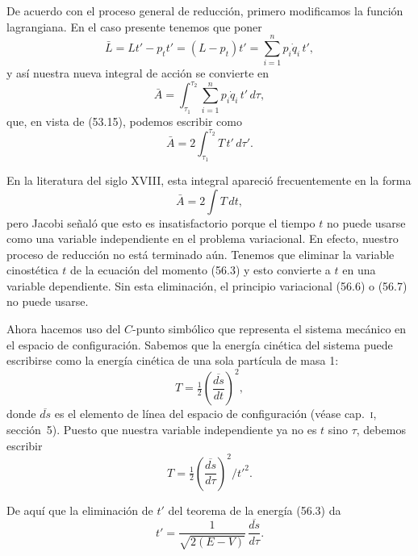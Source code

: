 \documentclass[12pt,a4paper]{book}
\begin{document}
De acuerdo con el proceso general de reducción, primero modificamos la función lagrangiana. En el caso presente tenemos que poner
\begin{equation}
\bar{L} = Lt' - p_t t' = (L - p_t)t' = \sum_{i=1}^{n} p_i \dot{q}_i \, t', \tag{56.4}
\end{equation}
y así nuestra nueva integral de acción se convierte en
\begin{equation}
\bar{A} = \int_{\tau_1}^{\tau_2} \sum_{i=1}^{n} p_i \dot{q}_i \, t' \, d\tau, \tag{56.5}
\end{equation}
que, en vista de (53.15), podemos escribir como
\begin{equation}
\bar{A} = 2\int_{\tau_1}^{\tau_2} T\,t' \, d\tau'. \tag{56.6}
\end{equation}

En la literatura del siglo XVIII, esta integral apareció frecuentemente en la forma
\begin{equation}
\bar{A} = 2\int T \, dt, \tag{56.7}
\end{equation}
pero Jacobi señaló que esto es insatisfactorio porque el tiempo $t$ no puede usarse como una variable independiente en el problema variacional. En efecto, nuestro proceso de reducción no está terminado aún. Tenemos que eliminar la variable cinostética $t$ de la ecuación del momento (56.3) y esto convierte a $t$ en una variable dependiente. Sin esta eliminación, el principio variacional (56.6) o (56.7) no puede usarse.

Ahora hacemos uso del $C$-punto simbólico que representa el sistema mecánico en el espacio de configuración. Sabemos que la energía cinética del sistema puede escribirse como la energía cinética de una sola partícula de masa 1:
\begin{equation}
T = \tfrac{1}{2}\left(\frac{\overline{ds}}{dt}\right)^2, \tag{56.8}
\end{equation}
donde $\overline{ds}$ es el elemento de línea del espacio de configuración (véase cap.~\textsc{i}, sección~5). Puesto que nuestra variable independiente ya no es $t$ sino $\tau$, debemos escribir
\begin{equation}
T = \tfrac{1}{2}\left(\frac{\overline{ds}}{d\tau}\right)^2 / t'^2. \tag{56.9}
\end{equation}

De aquí que la eliminación de $t'$ del teorema de la energía (56.3) da
\begin{equation}
t' = \frac{1}{\sqrt{2(E - V)}}\,\frac{\overline{ds}}{d\tau}. \tag{56.10}
\end{equation}
\end{document}
